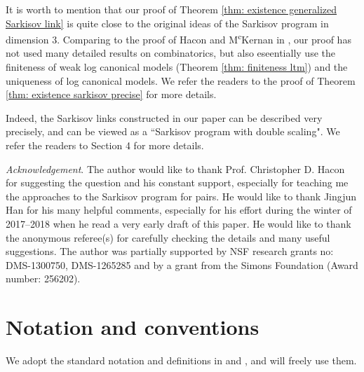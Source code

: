 \documentclass[11pt]{amsart}
\numberwithin{equation}{section}
\theoremstyle{definition}
\theoremstyle{remark}
\theoremstyle{definition}
\begin{document}
It is worth to mention that our proof of Theorem \ref{thm: existence generalized Sarkisov link} is quite close to the original ideas of the Sarkisov program in dimension $3$. Comparing to the proof of Hacon and M\textsuperscript{c}Kernan in \cite{HM09}, our proof has not used many detailed results on combinatorics, but also eseentially use the finiteness of weak log canonical models (Theorem \ref{thm: finiteness ltm}) and the uniqueness of log canonical models. We refer the readers to the proof of Theorem \ref{thm: existence sarkisov precise} for more details.

Indeed, the Sarkisov links constructed in our paper can be described very precisely, and can be viewed as a ``Sarkisov program with double scaling". We refer the readers to Section 4 for more details.

\medskip




\noindent\textit{Acknowledgement}. The author would like to thank Prof. Christopher D. Hacon for suggesting the question and his constant support, especially for teaching me the approaches to the Sarkisov program for pairs. He would like to thank Jingjun Han for his many helpful comments, especially for his effort during the winter of 2017--2018 when he read a very early draft of this paper. He would like to thank the anonymous referee(s) for carefully checking the details and many useful suggestions. The author was partially supported by NSF research grants no: DMS-1300750, DMS-1265285 and by a grant from the Simons Foundation (Award number: 256202). 


\section{Notation and conventions} 
We adopt the standard notation and definitions in \cite{Sho92} and \cite{KM98}, and will freely use them.
\end{document}
